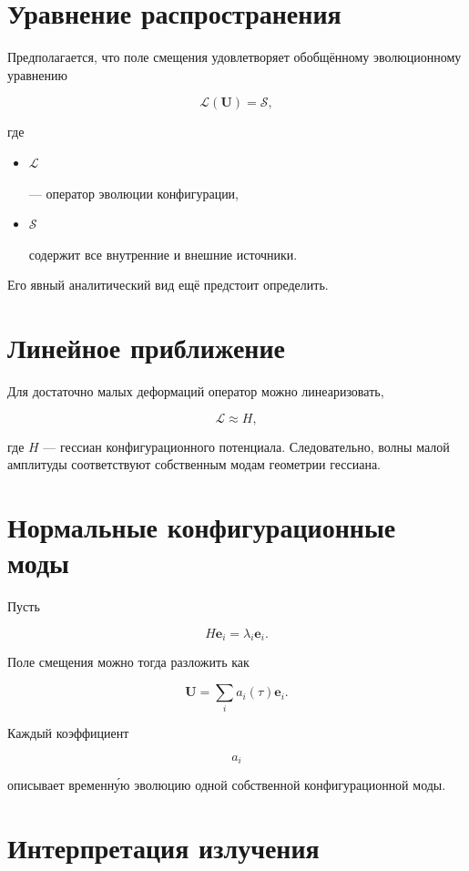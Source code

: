\section{Уравнение распространения}

Предполагается, что поле смещения удовлетворяет обобщённому эволюционному уравнению

\[ \boxed{ \mathcal L(\mathbf U) = \mathcal S, } \]

где

\begin{itemize}

\item
\(\mathcal L\)

— оператор эволюции конфигурации,

\item
\(\mathcal S\)

содержит все внутренние
и внешние источники.

\end{itemize}

Его явный аналитический вид ещё предстоит определить.

\section{Линейное приближение}

Для достаточно малых деформаций оператор можно линеаризовать,

\[ \mathcal L \approx H, \]

где \(H\) — гессиан конфигурационного потенциала. Следовательно, волны малой амплитуды соответствуют собственным модам геометрии гессиана.

\section{Нормальные конфигурационные моды}

Пусть

\[ H\mathbf e_i = \lambda_i \mathbf e_i. \]

Поле смещения можно тогда разложить как

\[ \boxed{ \mathbf U = \sum_i a_i(\tau) \mathbf e_i. } \]

Каждый коэффициент

\[ a_i \]

описывает временну́ю эволюцию одной собственной конфигурационной моды.

\section{Интерпретация излучения}

